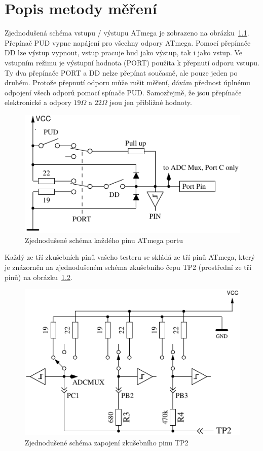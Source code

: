 \chapter{Popis metody měření}
\label{sec:measurement}
Zjednodušená schéma vstupu / výstupu ATmega je zobrazeno na obrázku~\ref{fig:port}.
Přepínač PUD vypne napájení pro všechny  odpory ATmega.
Pomocí přepínače DD lze výstup vypnout, vstup pracuje bud jako výstup, tak i jako vstup.
Ve vstupním režimu je výstupní hodnota (PORT) použita k přepnutí  odporu vstupu.
Ty dva přepínače PORT a DD nelze přepínat současně, ale pouze jeden po druhém.
Protože přepnutí  odporu může rušit měření, dávám přednost úplnému
odpojení všech   odporů pomocí spínače PUD.
Samozřejmě, že jsou přepínače elektronické a odpory \(19\Omega\) a \(22\Omega\) jsou jen přibližné hodnoty.

\begin{figure}[H]
\centering
\includegraphics[width=.8\textwidth]{../FIG/port.pdf}
\caption{Zjednodušené schéma každého pinu ATmega portu}
\label{fig:port}
\end{figure}

Každý ze tří zkušebních pinů vašeho testeru se skládá ze tří pinů ATmega,
který je znázorněn na zjednodušeném schéma zkušebního čepu TP2 (prostřední ze tří pinů) na obrázku~\ref{fig:terminal}.

\begin{figure}[H]
\centering
\includegraphics[width=.8\textwidth]{../FIG/terminal.pdf}
\caption{Zjednodušené schéma zapojení zkušebního pinu TP2}
\label{fig:terminal}
\end{figure}

